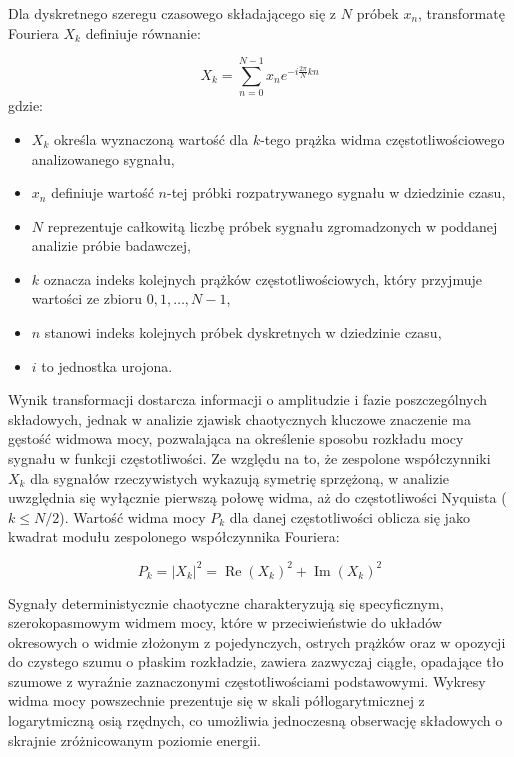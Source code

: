 Dla dyskretnego szeregu czasowego składającego się z $N$ próbek $x_n$, transformatę Fouriera $X_k$ definiuje równanie:
 
\begin{equation}
X_k = \sum_{n=0}^{N-1} x_n e^{-i \frac{2\pi}{N} k n}
\label{eq:dft_v2}
\end{equation}
gdzie:
\begin{itemize}
   \item $X_k$ określa wyznaczoną wartość dla $k$-tego prążka widma częstotliwościowego analizowanego sygnału,
   \item $x_n$ definiuje wartość $n$-tej próbki rozpatrywanego sygnału w dziedzinie czasu,
   \item $N$ reprezentuje całkowitą liczbę próbek sygnału zgromadzonych w poddanej analizie próbie badawczej,
   \item $k$ oznacza indeks kolejnych prążków częstotliwościowych, który przyjmuje wartości ze zbioru $0, 1, \dots, N-1$,
   \item $n$ stanowi indeks kolejnych próbek dyskretnych w dziedzinie czasu,
   \item $i$ to jednostka urojona.
\end{itemize}
 
Wynik transformacji dostarcza informacji o amplitudzie i fazie poszczególnych składowych, jednak w analizie zjawisk chaotycznych kluczowe znaczenie ma gęstość widmowa mocy, pozwalająca na określenie sposobu rozkładu mocy sygnału w funkcji częstotliwości. Ze względu na to, że zespolone współczynniki $X_k$ dla sygnałów rzeczywistych wykazują symetrię sprzężoną, w analizie uwzględnia się wyłącznie pierwszą połowę widma, aż do częstotliwości Nyquista ($k \le N/2$). Wartość widma mocy $P_k$ dla danej częstotliwości oblicza się jako kwadrat modułu zespolonego współczynnika Fouriera:
 
\begin{equation}
P_k = |X_k|^2 = \operatorname{Re}(X_k)^2 + \operatorname{Im}(X_k)^2
\label{eq:widmo_mocy_v2}
\end{equation}
 
Sygnały deterministycznie chaotyczne charakteryzują się specyficznym, szerokopasmowym widmem mocy, które w przeciwieństwie do układów okresowych o widmie złożonym z pojedynczych, ostrych prążków oraz w opozycji do czystego szumu o płaskim rozkładzie, zawiera zazwyczaj ciągłe, opadające tło szumowe z wyraźnie zaznaczonymi częstotliwościami podstawowymi. Wykresy widma mocy powszechnie prezentuje się w skali półlogarytmicznej z logarytmiczną osią rzędnych, co umożliwia jednoczesną obserwację składowych o skrajnie zróżnicowanym poziomie energii.
 
